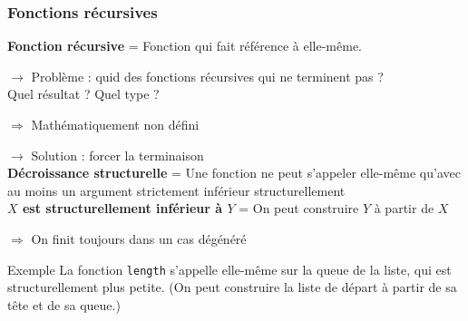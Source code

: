 \documentclass[9pt]{beamer}
\newenvironment{ex}[1][Exemple]{\begin{exampleblock}{#1}}{\end{exampleblock}}
\newenvironment{warn}[1][Attention]{\begin{alertblock}{#1}}{\end{alertblock}}
\newcommand{\defi}[1]{\textbf{#1}}
\begin{document}
\begin{frame}
\frametitle{Fonctions récursives}

\defi{Fonction récursive} = Fonction qui fait référence à elle-même.

\medskip
$\rightarrow$ Problème : quid des fonctions récursives qui ne terminent pas ?\\
Quel résultat ? Quel type ?
\begin{warn}[]
\centering$\Rightarrow$ Mathématiquement non défini
\end{warn}

\medskip
$\rightarrow$ Solution : forcer la terminaison\\
\defi{Décroissance structurelle} = Une fonction ne peut s'appeler elle-même qu'avec au moins un argument strictement inférieur structurellement\\
\defi{$X$ est structurellement inférieur à $Y$} = On peut construire $Y$ à partir de $X$\\
\begin{ex}[]
\centering$\Rightarrow$ On finit toujours dans un cas dégénéré
\end{ex}

\begin{ex}
La fonction \texttt{length} s'appelle elle-même sur la queue de la liste, qui est structurellement plus petite. (On peut construire la liste de départ à partir de sa tête et de sa queue.)
\end{ex}

\end{frame}
\end{document}
